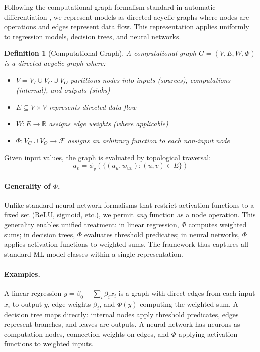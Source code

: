 \documentclass{article}
\newtheorem{definition}{Definition}
\begin{document}
Following the computational graph formalism standard in automatic differentiation \cite{griewank2008evaluating}, we represent models as directed acyclic graphs where nodes are operations and edges represent data flow. This representation applies uniformly to regression models, decision trees, and neural networks.

\begin{definition}[Computational Graph]
\label{def:computational-graph}
A computational graph $G = (V, E, W, \Phi)$ is a directed acyclic graph where:
\begin{itemize}
    \item $V = V_I \cup V_C \cup V_O$ partitions nodes into inputs (sources), computations (internal), and outputs (sinks)
    \item $E \subseteq V \times V$ represents directed data flow
    \item $W: E \rightarrow \mathbb{R}$ assigns edge weights (where applicable)
    \item $\Phi: V_C \cup V_O \rightarrow \mathcal{F}$ assigns an arbitrary function to each non-input node
\end{itemize}
\end{definition}

\noindent Given input values, the graph is evaluated by topological traversal:
\begin{equation}
a_v = \phi_v\left(\{(a_u, w_{uv}) : (u, v) \in E\}\right)
\end{equation}

\paragraph{Generality of $\Phi$.} Unlike standard neural network formalisms that restrict activation functions to a fixed set (ReLU, sigmoid, etc.), we permit \emph{any} function as a node operation. This generality enables unified treatment: in linear regression, $\Phi$ computes weighted sums; in decision trees, $\Phi$ evaluates threshold predicates; in neural networks, $\Phi$ applies activation functions to weighted sums. The framework thus captures all standard ML model classes within a single representation.

\paragraph{Examples.} A linear regression $y = \beta_0 + \sum_i \beta_i x_i$ is a graph with direct edges from each input $x_i$ to output $y$, edge weights $\beta_i$, and $\Phi(y)$ computing the weighted sum. A decision tree maps directly: internal nodes apply threshold predicates, edges represent branches, and leaves are outputs. A neural network has neurons as computation nodes, connection weights on edges, and $\Phi$ applying activation functions to weighted inputs.
\end{document}
